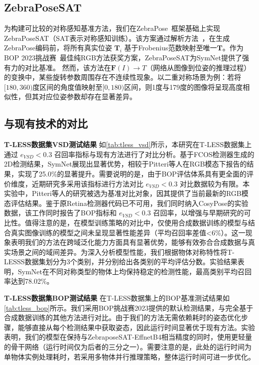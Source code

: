 \subsection{ZebraPoseSAT}
为构建可比较的对称感知基准方法，我们在ZebraPose~\cite{su2022zebrapose}框架基础上实现ZebraPoseSAT（SAT表示对称感知训练）。该方案通过解析方法~\cite{pitteri2019object}，在生成ZebraPose编码前，将所有真实位姿 $\mathbf{T}_i$ 基于Frobenius范数映射至唯一$\mathbf{T}$。作为BOP 2023挑战赛~\cite{hodan2024bop}最佳纯RGB方法获奖方案，ZebraPoseSAT为SymNet提供了强有力的对比基准。
然而，该方法在$\mathbf{F}(I) \rightarrow T$（网络从图像到位姿的推理过程）的变换中，某些旋转参数周围存在不连续性现象。以二重对称场景为例：若将$[180, 360)$度区间的角度值映射至$[0, 180)$区间，则1度与179度的图像将呈现高度相似性，但其对应位姿参数却存在显著差异。

\subsection{与现有技术的对比}

\textbf{T-LESS数据集VSD测试结果 } 如\autoref{tab:tless_vsd}所示，本研究在T-LESS数据集上通过 $e_{VSD}<0.3$ 召回率指标与现有方法进行了对比分析。基于FCOS\cite{fcos}检测器生成的2D检测结果，SymNet展现出显著优势，相较于Pitteri等人\cite{pitteri2019object}在RGB模态下报告的结果，实现了25.0\%的显著提升。需要说明的是，由于BOP评估体系具有更全面的评价维度，近期研究多采用该指标进行方法对比 $e_{VSD}<0.3$ 对比数据较为有限。本实验中，Pitteri等人的研究被选为基准对比对象，因其提供了当前最新的RGB模态评估结果。鉴于原Retina检测器代码已不可用，我们同时纳入CosyPose\cite{labbe2020cosypose}的实验数据，该工作同时报告了BOP指标和 $e_{VSD}<0.3$ 召回率，以增强与早期研究的可比性。值得注意的是，在模型训练策略的对比中，仅使用合成数据训练的模型与结合真实图像训练的模型之间未呈现显著性能差异（平均召回率差值<6\%）。这一现象表明我们的方法在跨域泛化能力方面具有显著优势，能够有效弥合合成数据与真实场景之间的域间差异。为深入分析模型性能，我们根据物体对称特性将T-LESSS数据集划分为3个类别，并分别给出各类别的平均评估分数。实验结果表明，SymNet在不同对称类型的物体上均保持稳定的检测性能，最高类别平均召回率达到78.02\%。



\textbf{T-LESS数据集BOP测试结果 } 在T-LESS数据集上的BOP基准测试结果如\autoref{tab:tless_bop}所示。我们采用BOP挑战赛2023\cite{hodan2024bop}提供的默认检测结果，与完全基于合成数据训练的其他方法进行对比。由于我们的方法无需依赖耗时的姿态优化步骤，能够直接从每个检测结果中获取姿态，因此运行时间显著优于现有方法。实验表明，我们的模型在保持与ZebraposeSAT-EffnetB4相当精度的同时，使用更轻量的骨干网络（运行时间仅为后者的三分之一）。需要注意的是，此处的运行时间为单物体实例处理耗时，若采用多物体并行推理策略，整体运行时间可进一步优化。

